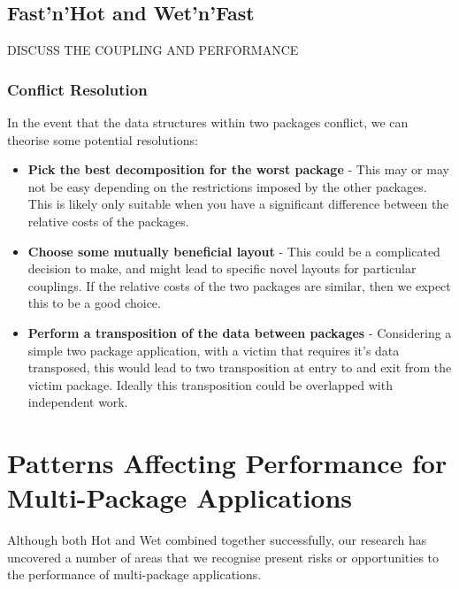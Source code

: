 \documentclass[runningheads,a4paper]{llncs}
\begin{document}
\subsection{Fast'n'Hot and Wet'n'Fast}

DISCUSS THE COUPLING AND PERFORMANCE

\subsubsection{Conflict Resolution}

In the event that the data structures within two packages conflict, we can theorise some potential resolutions:

\begin{itemize}
  \item \textbf{Pick the best decomposition for the worst package} - This may or may not be easy depending on the restrictions imposed by the other packages. This is likely only suitable when you have a significant difference between the relative costs of the packages.
  \item \textbf{Choose some mutually beneficial layout} - This could be a complicated decision to make, and might lead to specific novel layouts for particular couplings. If the relative costs of the two packages are similar, then we expect this to be a good choice.
  \item \textbf{Perform a transposition of the data between packages} - Considering a simple two package application, with a victim that requires it's data transposed, this would lead to two transposition at entry to and exit from the victim package. Ideally this transposition could be overlapped with independent work.
\end{itemize}

\section{Patterns Affecting Performance for Multi-Package Applications}

Although both Hot and Wet combined together successfully, our research has uncovered a number of areas that we recognise present risks or opportunities to the performance of multi-package applications. 
\end{document}
